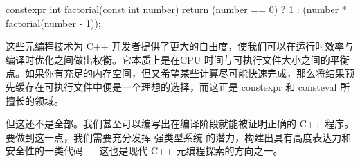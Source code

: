 \begin{cpp}
constexpr int factorial(const int number) {
  return (number == 0) ? 1 : (number * factorial(number - 1));
}
\end{cpp}

这些元编程技术为 C++ 开发者提供了更大的自由度，使我们可以在运行时效率与编译时优化之间做出权衡。它本质上是在CPU 时间与可执行文件大小之间的平衡点。如果你有充足的内存空间，但又希望某些计算尽可能快速完成，那么将结果预先缓存在可执行文件中便是一个理想的选择，而这正是 constexpr 和 consteval 所擅长的领域。

但这还不是全部。我们甚至可以编写出在编译阶段就能被证明正确的 C++ 程序。要做到这一点，我们需要充分发挥 强类型系统 的潜力，构建出具有高度表达力和安全性的一类代码 --- 这也是现代 C++ 元编程探索的方向之一。




